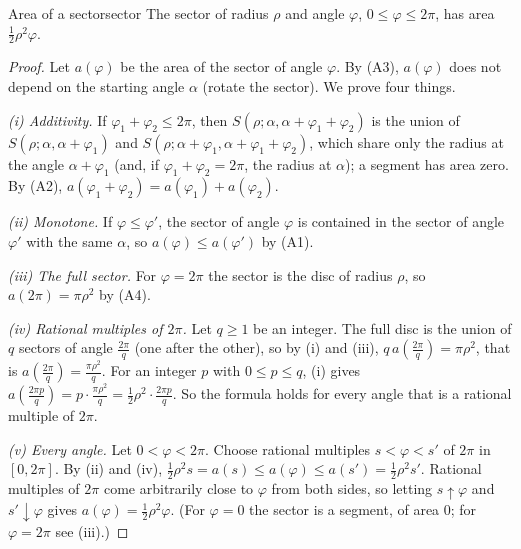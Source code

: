 \documentclass[11pt]{article}
\begin{document}
\begin{thm}{Area of a sector}{sector}
The sector of radius $\rho$ and angle $\varphi$, $0\le\varphi\le2\pi$, has area $\frac12\rho^2\varphi$.
\end{thm}
\begin{proof}
Let $a(\varphi)$ be the area of the sector of angle $\varphi$. By (A3), $a(\varphi)$ does not depend on the starting angle $\alpha$ (rotate the sector). We prove four things.

\emph{(i) Additivity.} If $\varphi_1+\varphi_2\le2\pi$, then $S(\rho;\alpha,\alpha+\varphi_1+\varphi_2)$ is the union of $S(\rho;\alpha,\alpha+\varphi_1)$ and $S(\rho;\alpha+\varphi_1,\alpha+\varphi_1+\varphi_2)$, which share only the radius at the angle $\alpha+\varphi_1$ (and, if $\varphi_1+\varphi_2=2\pi$, the radius at $\alpha$); a segment has area zero. By (A2), $a(\varphi_1+\varphi_2)=a(\varphi_1)+a(\varphi_2)$.

\emph{(ii) Monotone.} If $\varphi\le\varphi'$, the sector of angle $\varphi$ is contained in the sector of angle $\varphi'$ with the same $\alpha$, so $a(\varphi)\le a(\varphi')$ by (A1).

\emph{(iii) The full sector.} For $\varphi=2\pi$ the sector is the disc of radius $\rho$, so $a(2\pi)=\pi\rho^2$ by (A4).

\emph{(iv) Rational multiples of $2\pi$.} Let $q\ge1$ be an integer. The full disc is the union of $q$ sectors of angle $\frac{2\pi}q$ (one after the other), so by (i) and (iii), $q\,a\!\left(\frac{2\pi}q\right)=\pi\rho^2$, that is $a\!\left(\frac{2\pi}q\right)=\frac{\pi\rho^2}q$. For an integer $p$ with $0\le p\le q$, (i) gives $a\!\left(\frac{2\pi p}q\right)=p\cdot\frac{\pi\rho^2}q=\frac12\rho^2\cdot\frac{2\pi p}q$. So the formula holds for every angle that is a rational multiple of $2\pi$.

\emph{(v) Every angle.} Let $0<\varphi<2\pi$. Choose rational multiples $s<\varphi<s'$ of $2\pi$ in $[0,2\pi]$. By (ii) and (iv), $\frac12\rho^2s=a(s)\le a(\varphi)\le a(s')=\frac12\rho^2s'$. Rational multiples of $2\pi$ come arbitrarily close to $\varphi$ from both sides, so letting $s\uparrow\varphi$ and $s'\downarrow\varphi$ gives $a(\varphi)=\frac12\rho^2\varphi$. (For $\varphi=0$ the sector is a segment, of area $0$; for $\varphi=2\pi$ see (iii).)
\end{proof}
\end{document}
